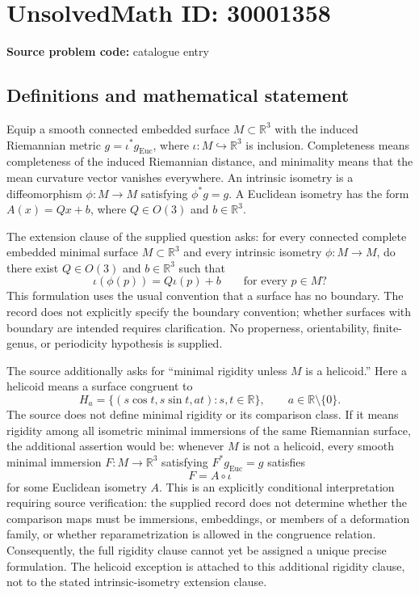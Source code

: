 \documentclass[11pt]{article}
\newcommand{\R}{\mathbb{R}}
\begin{document}
\section*{UnsolvedMath ID: 30001358}
\textbf{Source problem code:} catalogue entry
\subsection{Definitions and mathematical statement}
Equip a smooth connected embedded surface \(M\subset\R^3\) with the induced Riemannian metric \(g=\iota^*g_{\mathrm{Euc}}\), where \(\iota:M\hookrightarrow\R^3\) is inclusion. Completeness means completeness of the induced Riemannian distance, and minimality means that the mean curvature vector vanishes everywhere. An intrinsic isometry is a diffeomorphism \(\phi:M\to M\) satisfying \(\phi^*g=g\). A Euclidean isometry has the form \(A(x)=Qx+b\), where \(Q\in O(3)\) and \(b\in\R^3\).

The extension clause of the supplied question asks: for every connected complete embedded minimal surface \(M\subset\R^3\) and every intrinsic isometry \(\phi:M\to M\), do there exist \(Q\in O(3)\) and \(b\in\R^3\) such that
\[
\iota(\phi(p))=Q\iota(p)+b\qquad\text{for every }p\in M?
\]
This formulation uses the usual convention that a surface has no boundary. The record does not explicitly specify the boundary convention; whether surfaces with boundary are intended requires clarification. No properness, orientability, finite-genus, or periodicity hypothesis is supplied.

The source additionally asks for ``minimal rigidity unless \(M\) is a helicoid.'' Here a helicoid means a surface congruent to
\[
H_a=\{(s\cos t,s\sin t,at):s,t\in\R\},\qquad a\in\R\setminus\{0\}.
\]
The source does not define minimal rigidity or its comparison class. If it means rigidity among all isometric minimal immersions of the same Riemannian surface, the additional assertion would be: whenever \(M\) is not a helicoid, every smooth minimal immersion \(F:M\to\R^3\) satisfying \(F^*g_{\mathrm{Euc}}=g\) satisfies
\[
F=A\circ\iota
\]
for some Euclidean isometry \(A\). This is an explicitly conditional interpretation requiring source verification: the supplied record does not determine whether the comparison maps must be immersions, embeddings, or members of a deformation family, or whether reparametrization is allowed in the congruence relation. Consequently, the full rigidity clause cannot yet be assigned a unique precise formulation. The helicoid exception is attached to this additional rigidity clause, not to the stated intrinsic-isometry extension clause.
\end{document}
